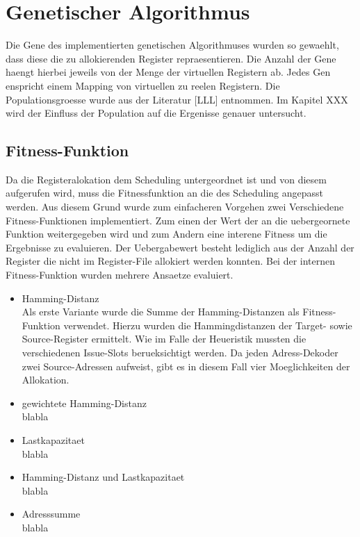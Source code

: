 \section{Genetischer Algorithmus}
\label{sec:genetischerAlgorithmus}
Die Gene des implementierten genetischen Algorithmuses wurden so gewaehlt, dass diese die zu allokierenden Register repraesentieren. Die Anzahl der Gene haengt hierbei jeweils von der Menge der virtuellen Registern ab. Jedes Gen enspricht einem Mapping von virtuellen zu reelen Registern.
Die Populationsgroesse wurde aus der Literatur [LLL] entnommen. Im Kapitel XXX wird der Einfluss der Population auf die Ergenisse genauer untersucht. 


\subsection{Fitness-Funktion}
Da die Registeralokation dem Scheduling untergeordnet ist und von diesem aufgerufen wird, muss die Fitnessfunktion an die des Scheduling angepasst werden. Aus diesem Grund wurde zum einfacheren Vorgehen zwei Verschiedene Fitness-Funktionen implementiert. Zum einen der Wert der an die uebergeornete Funktion weitergegeben wird und zum Andern eine interene Fitness um die Ergebnisse zu evaluieren.
Der Uebergabewert besteht lediglich aus der Anzahl der Register die nicht im Register-File allokiert werden konnten. Bei der internen Fitness-Funktion wurden mehrere Ansaetze evaluiert.
\begin{itemize}
	\item Hamming-Distanz\\
		Als erste Variante wurde die Summe der Hamming-Distanzen als Fitness-Funktion verwendet. Hierzu wurden die Hammingdistanzen der Target- sowie Source-Register ermittelt. Wie im Falle der Heueristik mussten die verschiedenen Issue-Slots berueksichtigt werden. Da jeden Adress-Dekoder zwei Source-Adressen aufweist, gibt es in diesem Fall vier Moeglichkeiten der Allokation.
	\item gewichtete Hamming-Distanz\\
		blabla
	\item Lastkapazitaet\\
		blabla
	\item Hamming-Distanz und Lastkapazitaet\\
		blabla
	\item Adresssumme\\
		blabla
\end{itemize}
 
